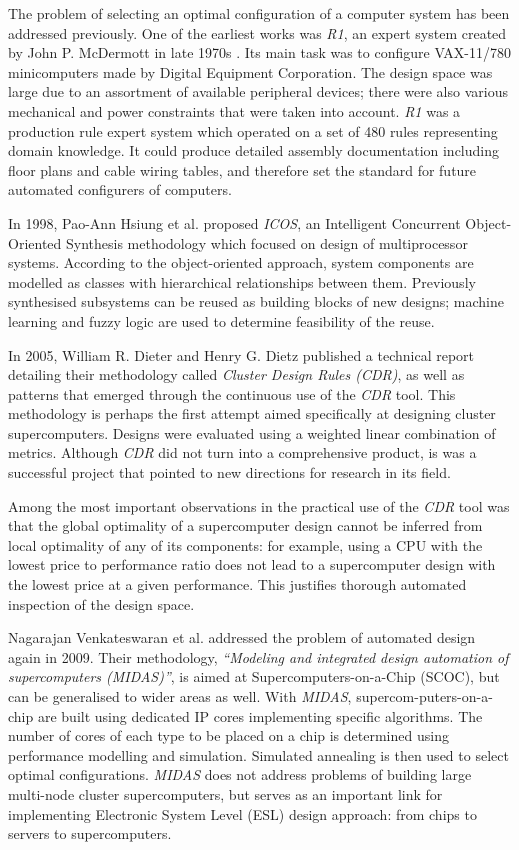 \documentclass[runningheads,a4paper]{llncs}
\begin{document}
The problem of selecting an optimal configuration of a computer system has been addressed previously. One of the earliest works was \emph{R1}, an expert system created by John P. McDermott in late 1970s \cite{mcdermott1980r1}. Its main task was to configure VAX-11/780 minicomputers made by Digital Equipment Corporation. The design space was large due to an assortment of available peripheral devices; there were also various mechanical and power constraints that were taken into account. \emph{R1} was a production rule expert system which operated on a set of 480 rules representing domain knowledge. It could produce detailed assembly documentation including floor plans and cable wiring tables, and therefore set the standard for future automated configurers of computers.

In 1998, Pao-Ann Hsiung et al. \cite{hsiung1998icos} proposed \emph{ICOS}, an Intelligent Concurrent Object-Oriented Synthesis methodology which focused on design of multiprocessor systems. According to the object-oriented approach, system components are modelled as classes with hierarchical relationships between them. Previously synthesised subsystems can be reused as building blocks of new designs; machine learning and fuzzy logic are used to determine feasibility of the reuse.

In 2005, William R. Dieter and Henry G. Dietz published a technical report \cite{dieter2005automatic} detailing their methodology called \emph{Cluster Design Rules (CDR)}, as well as patterns that emerged through the continuous use of the \emph{CDR} tool. This methodology is perhaps the first attempt aimed specifically at designing cluster supercomputers. Designs were evaluated using a weighted linear combination of metrics. Although \emph{CDR} did not turn into a comprehensive product, is was a successful project that pointed to new directions for research in its field.

Among the most important observations in the practical use of the \emph{CDR} tool was that the global optimality of a supercomputer design cannot be inferred from local optimality of any of its components: for example, using a CPU with the lowest price to performance ratio does not lead to a supercomputer design with the lowest price at a given performance. This justifies thorough automated inspection of the design space.

Nagarajan Venkateswaran et al. \cite{venkateswaran2009towards} addressed the problem of automated design again in 2009. Their methodology, \emph{``Modeling and integrated design automation of supercomputers (MIDAS)''}, is aimed at Supercomputers-on-a-Chip (SCOC), but can be generalised to wider areas as well. With \emph{MIDAS}, supercom-puters-on-a-chip are built using dedicated IP cores implementing specific algorithms. The number of cores of each type to be placed on a chip is determined using performance modelling and simulation. Simulated annealing is then used to select optimal configurations. \emph{MIDAS} does not address problems of building large multi-node cluster supercomputers, but serves as an important link for implementing Electronic System Level (ESL) design approach: from chips to servers to supercomputers.
\end{document}
